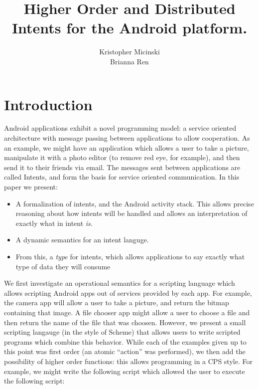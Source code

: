 \documentclass{acm_proc_article-sp}
\begin{document}
\title{Higher Order and Distributed Intents for the Android platform.}

\author{
\alignauthor
Kristopher Micinski\\
\alignauthor
Brianna Ren 
}

\maketitle

\begin{abstract}
\end{abstract}

\section{Introduction}
Android applications exhibit a novel programming model: a service
oriented architecture with message passing between applications to
allow cooperation.  As an example, we might have an application which
allows a user to take a picture, manipulate it with a photo editor (to
remove red eye, for example), and then send it to their friends via
email.  The messages sent between applications are called Intents, and
form the basis for service oriented communication.  In this paper we
present:

\begin{itemize}
\item A formalization of intents, and the Android activity stack.
  This allows precise reasoning about how intents will be handled and
  allows an interpretation of exactly what in intent \emph{is}.
\item A dynamic semantics for an intent languge.
\item From this, a \emph{type} for intents, which allows applications
  to say exactly what type of data they will consume 
\end{itemize}

We first investigate an operational semantics for a scripting language
which allows scripting Android apps out of services provided by each
app.  For example, the camera app will allow a user to take a picture,
and return the bitmap containing that image.  A file chooser app might
allow a user to choose a file and then return the name of the file
that was choosen.  However, we present a small scripting langauge (in
the style of Scheme) that allows users to write scripted programs
which combine this behavior.  While each of the examples given up to
this point was first order (an atomic ``action'' was performed), we
then add the possibility of higher order functions: this allows
programming in a CPS style.  For example, we might write the following
script which allowed the user to execute the following script:
\end{document}
